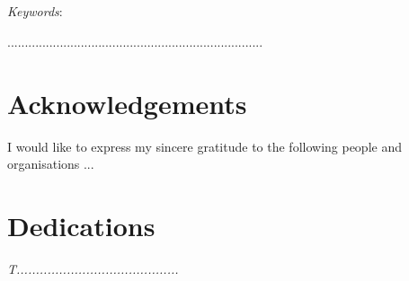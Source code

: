 \begin{abstract}[english]%
ddddddddddddddddddddddddddddddddddddd. 
\end{abstract}
\\\\
\textit{Keywords}: 



.........................................................................



\chapter*{Acknowledgements}%


I would like to express my sincere gratitude to the following people
and organisations ...


\chapter*{Dedications}%
 \vspace{6cm}
 \begin{center}\itshape
T..........................................
 \end{center}
\vfill
 \clearpage



\endinput
